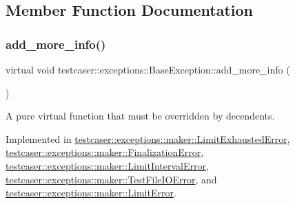 \subsection{Member Function Documentation}
\mbox{\label{classtestcaser_1_1exceptions_1_1BaseException_ad607ea04e2cb4ad9b8d0e2e6b6734f2f}} 
\subsubsection{\texorpdfstring{add\_more\_info()}{add\_more\_info()}}
{\footnotesize\ttfamily virtual void testcaser\+::exceptions\+::\+Base\+Exception\+::add\+\_\+more\+\_\+info (\begin{DoxyParamCaption}{ }\end{DoxyParamCaption})\hspace{0.3cm}{\ttfamily [pure virtual]}}



A pure virtual function that must be overridden by decendents. 



Implemented in \mbox{\hyperlink{classtestcaser_1_1exceptions_1_1maker_1_1LimitExhaustedError_a40beeee091c1d5a35a12d6ab974c0895}{testcaser\+::exceptions\+::maker\+::\+Limit\+Exhausted\+Error}}, \mbox{\hyperlink{classtestcaser_1_1exceptions_1_1maker_1_1FinalizationError_a2e0aee4c53427abcbbcf3d5704687d76}{testcaser\+::exceptions\+::maker\+::\+Finalization\+Error}}, \mbox{\hyperlink{classtestcaser_1_1exceptions_1_1maker_1_1LimitIntervalError_a6a050ee23517e8dcb6477011b4a5e406}{testcaser\+::exceptions\+::maker\+::\+Limit\+Interval\+Error}}, \mbox{\hyperlink{classtestcaser_1_1exceptions_1_1maker_1_1TestFileIOError_ab83e748d26f860c9b045535447a383c5}{testcaser\+::exceptions\+::maker\+::\+Test\+File\+I\+O\+Error}}, and \mbox{\hyperlink{classtestcaser_1_1exceptions_1_1maker_1_1LimitError_adb0f0c92f0d78b26f4310301f97bff3a}{testcaser\+::exceptions\+::maker\+::\+Limit\+Error}}.

\mbox{\label{classtestcaser_1_1exceptions_1_1BaseException_a92c371d40b0f3dbaa7de968ea67e5211}} 
